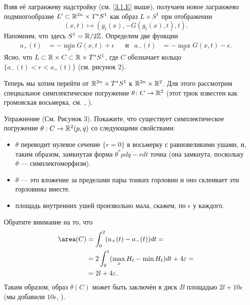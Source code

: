 \begin{figure}[ht!]
\vskip-0mm
\centering
\caption{}\label{pic-2}
\vskip0mm
\end{figure}

Взяв её лагранжеву надстройку (см. \ref{3.1.E} выше),
получаем новое лагранжево подмногообразие $L' \subset \RR^{2n} \z\times T^{\ast} S^1$ как образ $L \times S^1$ при отображении 
\[(x, t) \mapsto (g_t (x), -G (g_t (x), t), t).\]
Напомним, что здесь $S^1 = \mathbb{R} / 2\mathbb{Z}$.
Определим две функции 
\begin{align*}a_+ (t) &= - \min_x G (x, t) + \epsilon
&&\text{и}&
a_- (t) &= - \max_x G (x, t) - \epsilon.
\end{align*}
Ясно, что $L \subset \mathbb{R} \times C \subset \mathbb{R} \times T^\ast S^1$, где $C$ обозначает кольцо 
$\{a_- (t) <r <a_+ (t)\}$
(см. рисунок 2).

Теперь мы хотим перейти от $\mathbb{R}^{2n} \times T^{\ast} S^1$ к $\mathbb{R}^{2n} \times \mathbb{R}^2$.
Для этого рассмотрим специальное симплектическое погружение $\theta\colon C \to \mathbb{R}^2$
(этот трюк известен как громовская восьмерка, см. \cite{G1}, \cite{AL}).

\begin{thm*}{Упражнение}
(См. Рисунок 3).
Покажите, что существует симплектическое погружение $\theta: C \to \mathbb{R}^2 (p, q)$ со следующими свойствами: 
\begin{itemize}
\item $\theta$ переводит нулевое сечение $\{r = 0\}$ в восьмерку с равновеликими ушами, и, таким образом, замкнутая форма $\theta^\ast pdq - rdt$ точна (она замкнута, поскольку $\theta$ --- симплектоморфизм).
\item $\theta$ --- это вложение за пределами пары тонких горловин и оно склеивает эти горловины вместе.
\item площадь внутренних ушей произвольно мала, скажем, по $\epsilon$ у каждого. 
\end{itemize}
\end{thm*}

Обратите внимание на то, что \?{}{$\area=\Area$}
\begin{align*}
\area (C) 
&= \int_0^2(a_+ (t) - a_- (t)) dt = 
\\
&=2 \int_0^1(\max_x H_t - \min H_t) dt + 4\epsilon =
\\
&=2l + 4\epsilon.
\end{align*}
Таким образом, образ $\theta (C)$ может быть заключён в диск $B$ площадью $2l + 10\epsilon$ (мы добавили $10\epsilon$, ).

